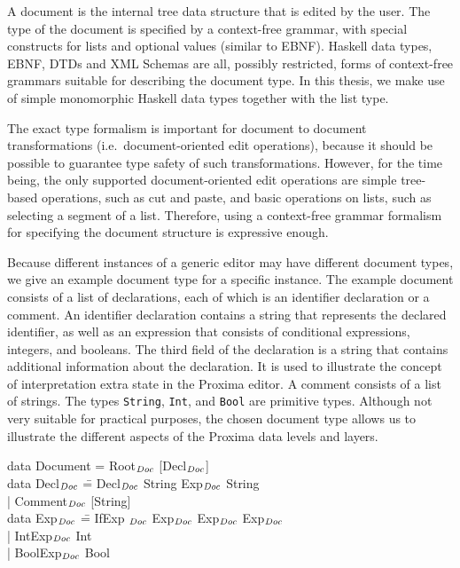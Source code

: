 \documentclass{speauth}
\begin{document}
A document is the internal tree data structure that is edited by the user. The type of the document is specified by a context-free grammar, with special constructs for lists and optional values (similar to EBNF). Haskell data types, EBNF, DTDs and XML Schemas are all, possibly restricted, forms of context-free grammars suitable for describing the document type. In this thesis, we make use of simple monomorphic Haskell data types together with the list type.

The exact type formalism is important for document to document transformations (i.e.\ document-oriented edit operations), because it should be possible to guarantee type safety of such transformations. However, for the time being, the only supported document-oriented edit operations are simple tree-based operations, such as cut and paste, and basic operations on lists, such as selecting a segment of a list. Therefore, using a context-free grammar formalism for specifying the document structure is expressive enough.
 
Because different instances of a generic editor may have different document types, we give an example document type for a specific instance. The example document consists of a list of declarations, each of which is an identifier declaration or a comment. An identifier declaration contains a string that represents the declared identifier, as well as an expression that consists of conditional expressions, integers, and booleans. The third field of the declaration is a string that contains additional information about the declaration. It is used to illustrate the concept of interpretation extra state in the Proxima editor. A comment consists of a list of strings. The types {\tt String}, {\tt Int}, and {\tt Bool} are primitive types. Although not very suitable for practical purposes, the chosen document type allows us to illustrate the different aspects of the Proxima data levels and layers.

\noindent
\ttfamily
\begin{tabbing}
data Document = Root$_{\mathit{Doc}}$ [Decl$_{\mathit{Doc}}$]\\
data Decl$_{\mathit{Doc}}$ \= = Decl$_{\mathit{Doc}}$ String Exp$_{\mathit{Doc}}$ String\\
                            \> | Comment$_{\mathit{Doc}}$ [String]\\
data Exp$_{\mathit{Doc}}$ \= =  IfExp $_{\mathit{Doc}}$ Exp$_{\mathit{Doc}}$ Exp$_{\mathit{Doc}}$ Exp$_{\mathit{Doc}}$\\
                 \> | IntExp$_{\mathit{Doc}}$ Int\\
                 \> | BoolExp$_{\mathit{Doc}}$ Bool\\
\end{tabbing}
\rmfamily
\end{document}
